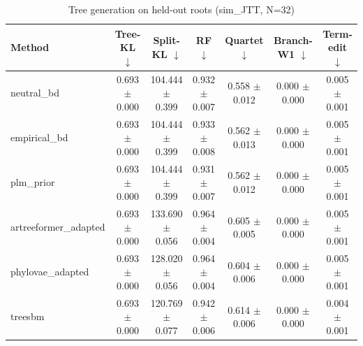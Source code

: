 \begin{table}[t]\centering
\caption{Tree generation on held-out roots (sim_JTT, N=32)}
\begin{tabular}{lcccccc}
\toprule
Method & Tree-KL $\downarrow$ & Split-KL $\downarrow$ & RF $\downarrow$ & Quartet $\downarrow$ & Branch-W1 $\downarrow$ & Term-edit $\downarrow$ \\
\midrule
neutral\_bd & 0.693 $\pm$ 0.000 & 104.444 $\pm$ 0.399 & 0.932 $\pm$ 0.007 & 0.558 $\pm$ 0.012 & 0.000 $\pm$ 0.000 & 0.005 $\pm$ 0.001 \\
empirical\_bd & 0.693 $\pm$ 0.000 & 104.444 $\pm$ 0.399 & 0.933 $\pm$ 0.008 & 0.562 $\pm$ 0.013 & 0.000 $\pm$ 0.000 & 0.005 $\pm$ 0.001 \\
plm\_prior & 0.693 $\pm$ 0.000 & 104.444 $\pm$ 0.399 & 0.931 $\pm$ 0.007 & 0.562 $\pm$ 0.012 & 0.000 $\pm$ 0.000 & 0.005 $\pm$ 0.001 \\
artreeformer\_adapted & 0.693 $\pm$ 0.000 & 133.690 $\pm$ 0.056 & 0.964 $\pm$ 0.004 & 0.605 $\pm$ 0.005 & 0.000 $\pm$ 0.000 & 0.005 $\pm$ 0.001 \\
phylovae\_adapted & 0.693 $\pm$ 0.000 & 128.020 $\pm$ 0.056 & 0.964 $\pm$ 0.004 & 0.604 $\pm$ 0.006 & 0.000 $\pm$ 0.000 & 0.005 $\pm$ 0.001 \\
treesbm & 0.693 $\pm$ 0.000 & 120.769 $\pm$ 0.077 & 0.942 $\pm$ 0.006 & 0.614 $\pm$ 0.006 & 0.000 $\pm$ 0.000 & 0.004 $\pm$ 0.001 \\
\bottomrule
\end{tabular}
\end{table}